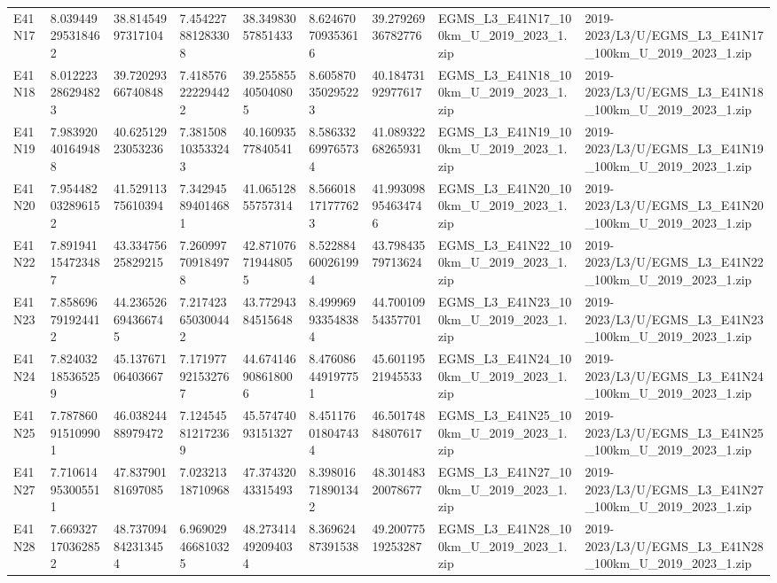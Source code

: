 \begin{landscape}
\begin{longtable}{lllllllll}
E41N17 & 8.039449295318462 & 38.81454997317104 & 7.454227881283308 & 38.34983057851433 & 8.624670709353616 & 39.27926936782776 & EGMS\_L3\_E41N17\_100km\_U\_2019\_2023\_1.zip & 2019-2023/L3/U/EGMS\_L3\_E41N17\_100km\_U\_2019\_2023\_1.zip \\
E41N18 & 8.012223286294823 & 39.72029366740848 & 7.418576222294422 & 39.255855405040805 & 8.605870350295223 & 40.18473192977617 & EGMS\_L3\_E41N18\_100km\_U\_2019\_2023\_1.zip & 2019-2023/L3/U/EGMS\_L3\_E41N18\_100km\_U\_2019\_2023\_1.zip \\
E41N19 & 7.983920401649488 & 40.62512923053236 & 7.381508103533243 & 40.16093577840541 & 8.586332699765734 & 41.08932268265931 & EGMS\_L3\_E41N19\_100km\_U\_2019\_2023\_1.zip & 2019-2023/L3/U/EGMS\_L3\_E41N19\_100km\_U\_2019\_2023\_1.zip \\
E41N20 & 7.954482032896152 & 41.52911375610394 & 7.342945894014681 & 41.06512855757314 & 8.566018171777623 & 41.993098954634746 & EGMS\_L3\_E41N20\_100km\_U\_2019\_2023\_1.zip & 2019-2023/L3/U/EGMS\_L3\_E41N20\_100km\_U\_2019\_2023\_1.zip \\
E41N22 & 7.891941154723487 & 43.33475625829215 & 7.260997709184978 & 42.871076719448055 & 8.522884600261994 & 43.79843579713624 & EGMS\_L3\_E41N22\_100km\_U\_2019\_2023\_1.zip & 2019-2023/L3/U/EGMS\_L3\_E41N22\_100km\_U\_2019\_2023\_1.zip \\
E41N23 & 7.858696791924412 & 44.236526694366745 & 7.217423650300442 & 43.77294384515648 & 8.499969933548384 & 44.70010954357701 & EGMS\_L3\_E41N23\_100km\_U\_2019\_2023\_1.zip & 2019-2023/L3/U/EGMS\_L3\_E41N23\_100km\_U\_2019\_2023\_1.zip \\
E41N24 & 7.824032185365259 & 45.13767106403667 & 7.171977921532767 & 44.674146908618006 & 8.476086449197751 & 45.60119521945533 & EGMS\_L3\_E41N24\_100km\_U\_2019\_2023\_1.zip & 2019-2023/L3/U/EGMS\_L3\_E41N24\_100km\_U\_2019\_2023\_1.zip \\
E41N25 & 7.787860915109901 & 46.03824488979472 & 7.124545812172369 & 45.57474093151327 & 8.451176018047434 & 46.50174884807617 & EGMS\_L3\_E41N25\_100km\_U\_2019\_2023\_1.zip & 2019-2023/L3/U/EGMS\_L3\_E41N25\_100km\_U\_2019\_2023\_1.zip \\
E41N27 & 7.710614953005511 & 47.83790181697085 & 7.02321318710968 & 47.37432043315493 & 8.398016718901342 & 48.30148320078677 & EGMS\_L3\_E41N27\_100km\_U\_2019\_2023\_1.zip & 2019-2023/L3/U/EGMS\_L3\_E41N27\_100km\_U\_2019\_2023\_1.zip \\
E41N28 & 7.669327170362852 & 48.737094842313454 & 6.969029466810325 & 48.273414492094034 & 8.36962487391538 & 49.20077519253287 & EGMS\_L3\_E41N28\_100km\_U\_2019\_2023\_1.zip & 2019-2023/L3/U/EGMS\_L3\_E41N28\_100km\_U\_2019\_2023\_1.zip \\

\end{longtable}
\end{landscape}
